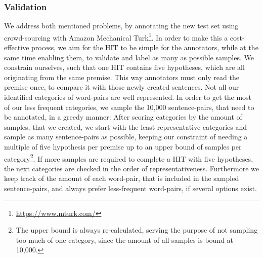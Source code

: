 \subsubsection{Validation}
We address both mentioned problems, by annotating the new test set using crowd-sourcing with Amazon Mechanical Turk\footnote{\href{https://www.mturk.com/}{https://www.mturk.com/}}. In order to make this a cost-effective process, we aim for the \ac{HIT} to be simple for the annotators, while at the same time enabling them, to validate and label as many as possible samples. We constrain ourselves, such that one \ac{HIT} contains five hypotheses, which are all originating from the same premise. This way annotators must only read the premise once, to compare it with those newly created sentences. Not all our identified categories of word-pairs are well represented. In order to get the most of our less frequent categories, we sample the 10,000 sentence-pairs, that need to be annotated, in a greedy manner: After scoring categories by the amount of samples, that we created, we start with the least representative categories and sample as many sentence-pairs as possible, keeping our constraint of needing a multiple of five hypothesis per premise up to an upper bound of samples per category\footnote{The upper bound is always re-calculated, serving the purpose of not sampling too much of one category, since the amount of all samples is bound at 10,000.}. If more samples are required to complete a \ac{HIT} with five hypotheses, the next categories are checked in the order of representativeness. Furthermore we keep track of the amount of each word-pair, that is included in the sampled sentence-pairs, and always prefer less-frequent word-pairs, if several options exist.
